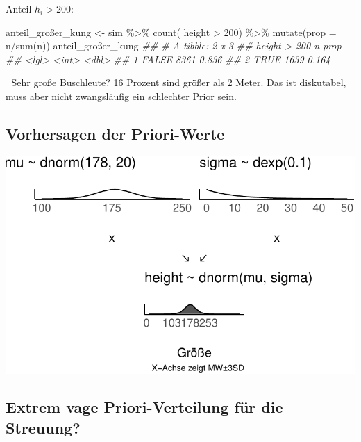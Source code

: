 \documentclass[
  a4paper,
  DIV=11]{scrreprt}
\newenvironment{Shaded}{\begin{snugshade}}{\end{snugshade}}
\newcommand{\AttributeTok}[1]{\textcolor[rgb]{0.40,0.45,0.13}{#1}}
\newcommand{\DecValTok}[1]{\textcolor[rgb]{0.68,0.00,0.00}{#1}}
\newcommand{\DocumentationTok}[1]{\textcolor[rgb]{0.37,0.37,0.37}{\textit{#1}}}
\newcommand{\FunctionTok}[1]{\textcolor[rgb]{0.28,0.35,0.67}{#1}}
\newcommand{\NormalTok}[1]{\textcolor[rgb]{0.00,0.23,0.31}{#1}}
\newcommand{\OtherTok}[1]{\textcolor[rgb]{0.00,0.23,0.31}{#1}}
\newcommand{\SpecialCharTok}[1]{\textcolor[rgb]{0.37,0.37,0.37}{#1}}
\theoremstyle{definition}
\theoremstyle{remark}
\begin{document}
Anteil \(h_i > 200\):

\begin{Shaded}
\begin{Highlighting}[]
\NormalTok{anteil\_großer\_kung }\OtherTok{\textless{}{-}} 
\NormalTok{sim }\SpecialCharTok{\%\textgreater{}\%} 
  \FunctionTok{count}\NormalTok{( height }\SpecialCharTok{\textgreater{}} \DecValTok{200}\NormalTok{) }\SpecialCharTok{\%\textgreater{}\%} 
  \FunctionTok{mutate}\NormalTok{(}\AttributeTok{prop =}\NormalTok{ n}\SpecialCharTok{/}\FunctionTok{sum}\NormalTok{(n))}
\NormalTok{anteil\_großer\_kung}
\DocumentationTok{\#\# \# A tibble: 2 x 3}
\DocumentationTok{\#\#   \textasciigrave{}height \textgreater{} 200\textasciigrave{}     n  prop}
\DocumentationTok{\#\#   \textless{}lgl\textgreater{}          \textless{}int\textgreater{} \textless{}dbl\textgreater{}}
\DocumentationTok{\#\# 1 FALSE           8361 0.836}
\DocumentationTok{\#\# 2 TRUE            1639 0.164}
\end{Highlighting}
\end{Shaded}

🤔 Sehr große Buschleute? 16 Prozent sind größer als 2 Meter. Das ist
diskutabel, muss aber nicht zwangsläufig ein schlechter Prior sein.

\hypertarget{vorhersagen-der-priori-werte}{%
\subsection{Vorhersagen der
Priori-Werte}\label{vorhersagen-der-priori-werte}}

\includegraphics{./gauss_files/figure-pdf/Kung-15-1.pdf}

\hypertarget{extrem-vage-priori-verteilung-fuxfcr-die-streuung}{%
\subsection{Extrem vage Priori-Verteilung für die
Streuung?}\label{extrem-vage-priori-verteilung-fuxfcr-die-streuung}}
\end{document}
